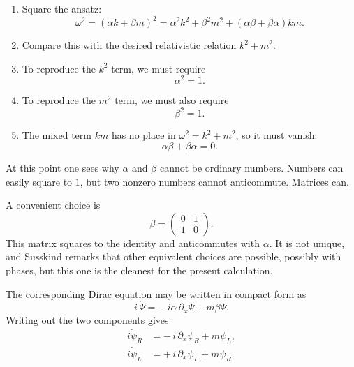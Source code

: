 \begin{enumerate}
\item Square the ansatz:
\begin{equation}
\omega^2
=
(\alpha k+\beta m)^2
=
\alpha^2k^2+\beta^2m^2+(\alpha\beta+\beta\alpha)km.
\end{equation}

\item Compare this with the desired relativistic relation \(k^2+m^2\).

\item To reproduce the \(k^2\) term, we must require
\begin{equation}
\alpha^2=1.
\end{equation}

\item To reproduce the \(m^2\) term, we must also require
\begin{equation}
\beta^2=1.
\end{equation}

\item The mixed term \(km\) has no place in \(\omega^2=k^2+m^2\), so it must vanish:
\begin{equation}
\alpha\beta+\beta\alpha=0.
\end{equation}
\end{enumerate}

At this point one sees why \(\alpha\) and \(\beta\) cannot be ordinary numbers. Numbers can easily square to \(1\), but two nonzero numbers cannot anticommute. Matrices can.

A convenient choice is
\begin{equation}
\beta=\begin{pmatrix}0&1\\1&0\end{pmatrix}.
\end{equation}
This matrix squares to the identity and anticommutes with \(\alpha\). It is not unique, and Susskind remarks that other equivalent choices are possible, possibly with phases, but this one is the cleanest for the present calculation.

The corresponding Dirac equation may be written in compact form as
\begin{equation}
i\,\dot{\Psi}
=
-\,i\alpha\,\partial_x\Psi
+
m\beta\Psi.
\end{equation}
Writing out the two components gives
\begin{align}
i\dot{\psi}_R &= -\,i\,\partial_x\psi_R + m\psi_L,\\
i\dot{\psi}_L &= +\,i\,\partial_x\psi_L + m\psi_R.
\end{align}

